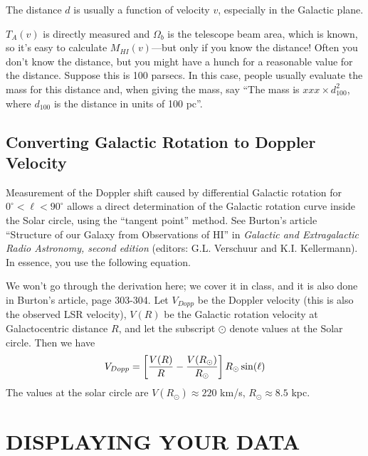 \documentclass[psfig,preprint]{aastex}
\begin{document}
\noindent The distance $d$ is usually a function of velocity $v$,
especially in the Galactic plane. 

	$T_A(v)$ is directly measured and $\Omega_b$ is the telescope
beam area, which is known, so it's easy to calculate $M_{HI}(v)$---but
only if you know the distance! Often you don't know the distance, but
you might have a hunch for a reasonable value for the distance. Suppose
this is 100 parsecs. In this case, people usually evaluate the mass for
this distance and, when giving the mass, say ``The mass is $xxx \times
d_{100}^2$, where $d_{100}$ is the distance in units of 100 pc''.

\subsection{Converting Galactic Rotation to Doppler Velocity}

          Measurement of the Doppler shift caused by differential
Galactic rotation for $0^\circ < \ell < 90^\circ$ allows a direct
determination of the Galactic rotation curve inside the Solar circle,
using the ``tangent point'' method. See Burton's article ``Structure
of our Galaxy from Observations of HI'' in {\it Galactic and
Extragalactic Radio Astronomy, second edition} (editors: G.L. Verschuur
and K.I. Kellermann). In essence, you use the following equation.

	We won't go through the derivation here; we cover it in class,
and it is also done in Burton's article,
page 303-304.  Let $V_{Dopp}$ be the Doppler velocity (this is also the
observed LSR velocity), $V(R)$ be the Galactic rotation velocity at
Galactocentric distance $R$, and let the subscript $\odot$ denote values
at the Solar circle.  Then we have
\begin{equation} \label{vdopp}
V_{Dopp} = \left[ {V(R) \over R} - {V(R_\odot) \over R_\odot}\right]
R_\odot \sin(\ell)
\end{equation}
\noindent The values at the solar circle are $V(R_\odot) \approx 220$
km/s, $R_\odot \approx 8.5$ kpc.

\section{DISPLAYING YOUR DATA} \label{datadisplay}
\end{document}

